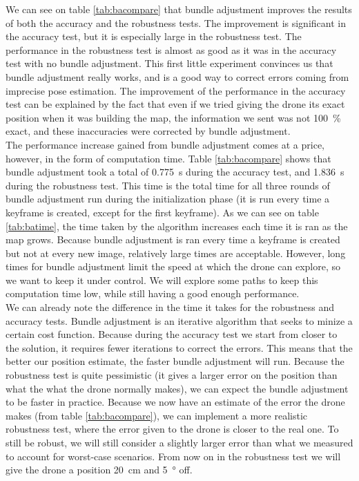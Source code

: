 We can see on table \ref{tab:bacompare} that bundle adjustment improves the results of both the accuracy and the robustness tests. The improvement is significant in the accuracy test, but it is especially large in the robustness test. The performance in the robustness test is almost as good as it was in  the accuracy test with no bundle adjustment. This first little experiment convinces us that bundle adjustment really works, and is a good way to correct errors coming from imprecise pose estimation. The improvement of the performance in the accuracy test can be explained by the fact that even if we tried giving the drone its exact position when it was building the map, the information we sent was not \SI{100}{\percent} exact, and these inaccuracies were corrected by bundle adjustment.\\

The performance increase gained from bundle adjustment comes at a price, however, in the form of computation time. Table \ref{tab:bacompare} shows that bundle adjustment took a total of \SI{0.775}{\second} during the accuracy test, and \SI{1.836}{\second} during the robustness test. This time is the total time for all three rounds of bundle adjustment run during the initialization phase (it is run every time a keyframe is created, except for the first keyframe). As we can see on table \ref{tab:batime}, the time taken by the algorithm increases each time it is ran as the map grows. Because bundle adjustment is ran every time a keyframe is created but not at every new image, relatively large times are acceptable. However, long times for bundle adjustment limit the speed at which the drone can explore, so we want to keep it under control. We will explore some paths to keep this computation time low, while still having a good enough performance. \\
We can already note the difference in the time it takes for the robustness and accuracy tests. Bundle adjustment is an iterative algorithm that seeks to minize a certain cost function. Because during the accuracy test we start from closer to the solution, it requires fewer iterations to correct the errors. This means that the better our position estimate, the faster bundle adjustment will run. Because the robustness test is quite pessimistic (it gives a larger error on the position than what the what the drone normally makes), we can expect the bundle adjustment to be faster in practice. Because we now have an estimate of the error the drone makes (from table \ref{tab:bacompare}), we can implement a more realistic robustness test, where the error given to the drone is closer to the real one. To still be robust, we will still consider a slightly larger error than what we measured to account for worst-case scenarios. From now on in the robustness test we will give the drone a position \SI{20}{\centi\meter} and \SI{5}{\degree} off. \\


